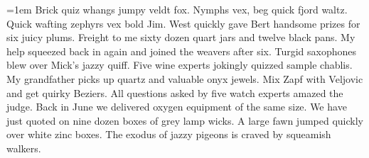 
\newdimen\leading
\newdimen\ascheight
\newdimen\xheight
\newdimen\adjust
\newdimen\sampletextwd
\newdimen\gutter
\newdimen\dist
\newdimen\mainleading

\newcount\scratch
\newcount\divisor
\newcount\spconv
\newcount\divisor
\newcount\scratch
\newcount\sscratch
\newcount\intgp
\newcount\fracp

\newtoks\texttoks




\def\setleading{%
\setbox0=\hbox{Ilpgy}%
\setbox1=\hbox{x}%
\xheight=\ht1
\ascheight=\ht0
\leading=\ht0
\adjust=\xheight \advance\adjust-.5\leading
\advance\leading\dp0
\leading=1.2\leading  
\ifdim\dp0<.05\ht0 \advance\adjust.5\xheight\fi
\advance\leading by \adjust
\baselineskip=\leading}

\def\typefact#1{%
\dist=10pt
\font\facttext=#1 at\dist
\spconv=\number\dist
\multiply\spconv by 12
\multiply\spconv by 204
\setbox1=\hbox{\facttext\freqabc}%
\divisor=\number\wd1
\divide\divisor by 100
\divide\spconv by \divisor
\scratch=\spconv 
	\divide\scratch100
 \divisor=\scratch
 \multiply \scratch100
 \advance\spconv-\scratch
 \hbox{\number\divisor.\ifnum\spconv<10 0\the\spconv \else \the\spconv\fi}}
 
\def\prettypt#1{\dist=#1%
\multiply\dist10%
\scratch=\number\dist
\divide\scratch65536%
\intgp=\scratch \divide\intgp10%
\sscratch=\intgp 
\multiply\sscratch10 \advance\scratch-\sscratch
\fracp=\scratch
\hbox{\the\intgp.\the\fracp}pt}

\def\displaytype#1{%
\font\bigtype=#1 at 24pt
\font\medtype=#1 at 18pt
\font\normtype=#1 at 14pt
\font\smalltype=#1 at 12pt
\font\tinytype=#1 at 10pt
\font\tinytinytype=#1 at 8pt}

\texttoks={\emergencystretch1em Brick quiz whangs jumpy veldt fox.
Nymphs vex, beg quick fjord waltz.
Quick wafting zephyrs vex bold Jim.
West quickly gave Bert handsome prizes for six juicy plums.
Freight to me sixty dozen quart jars and twelve black pans.
My help squeezed back in again and joined the weavers after six.
Turgid saxophones blew over Mick's jazzy quiff.
Five wine experts jokingly quizzed sample chablis.
My grandfather picks up quartz and valuable onyx jewels.
Mix Zapf with Veljovic and get quirky Beziers.
All questions asked by five watch experts amazed the judge.
Back in June we delivered oxygen equipment of the same size.
We have just quoted on nine dozen boxes of grey lamp wicks.
A large fawn jumped quickly over white zinc boxes.
The exodus of jazzy pigeons is craved by squeamish walkers.}

